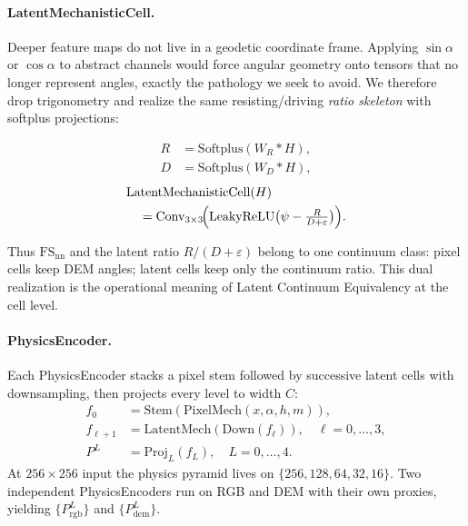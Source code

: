\paragraph{LatentMechanisticCell.}
Deeper feature maps do not live in a geodetic coordinate frame. Applying \(\sin\alpha\) or \(\cos\alpha\) to abstract channels would force angular geometry onto tensors that no longer represent angles, exactly the pathology we seek to avoid. We therefore drop trigonometry and realize the same resisting/driving \emph{ratio skeleton} with softplus projections:
\begin{definition}[LatentMechanisticCell]
\label{def:latent}
\begin{equation}
\label{eq:latent-rd}
\begin{aligned}
R&=\mathrm{Softplus}(W_R*H),\\
D&=\mathrm{Softplus}(W_D*H),
\end{aligned}
\end{equation}
\begin{equation}
\label{eq:latent}
\begin{split}
&\mathrm{LatentMechanisticCell}(H)\\
&\quad=
\mathrm{Conv}_{3\times3}\!\Bigl(
\mathrm{LeakyReLU}\bigl(
\psi-\tfrac{R}{D+\varepsilon}
\bigr)
\Bigr).
\end{split}
\end{equation}
\end{definition}
Thus \(\mathrm{FS}_{\mathrm{nn}}\) and the latent ratio \(R/(D+\varepsilon)\) belong to one continuum class: pixel cells keep DEM angles; latent cells keep only the continuum ratio. This dual realization is the operational meaning of Latent Continuum Equivalency at the cell level.

\paragraph{PhysicsEncoder.}
Each PhysicsEncoder stacks a pixel stem followed by successive latent cells with downsampling, then projects every level to width \(C\):
\begin{equation}
\label{eq:phys-enc}
\begin{aligned}
f_0&=\mathrm{Stem}(\mathrm{PixelMech}(x,\alpha,h,m)),\\
f_{\ell+1}&=\mathrm{LatentMech}(\mathrm{Down}(f_\ell)),
\quad \ell=0,\ldots,3,\\
P^{L}&=\mathrm{Proj}_{L}(f_{L}),
\quad L=0,\ldots,4.
\end{aligned}
\end{equation}
At \(256\times256\) input the physics pyramid lives on \(\{256,128,64,32,16\}\). Two independent PhysicsEncoders run on RGB and DEM with their own proxies, yielding \(\{P_{\mathrm{rgb}}^{L}\}\) and \(\{P_{\mathrm{dem}}^{L}\}\).

